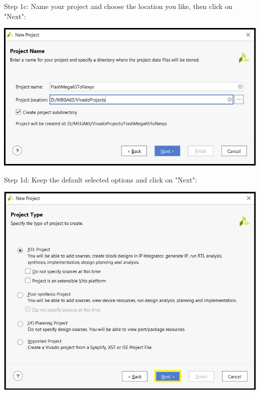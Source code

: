 \begin{minipage}{\linewidth}
  Step 1c: Name your project and choose the location you like, then click on "Next":\\
  \begin{center}
    \includegraphics[width=0.8\linewidth]{images/vivado01c.png}
  \end{center}
\end{minipage}

\vspace{5mm}

\begin{minipage}{\linewidth}
  Step 1d: Keep the default selected options and click on "Next": \\
  \begin{center}
    \includegraphics[width=0.8\linewidth]{images/vivado01d.png}
  \end{center}
\end{minipage}

